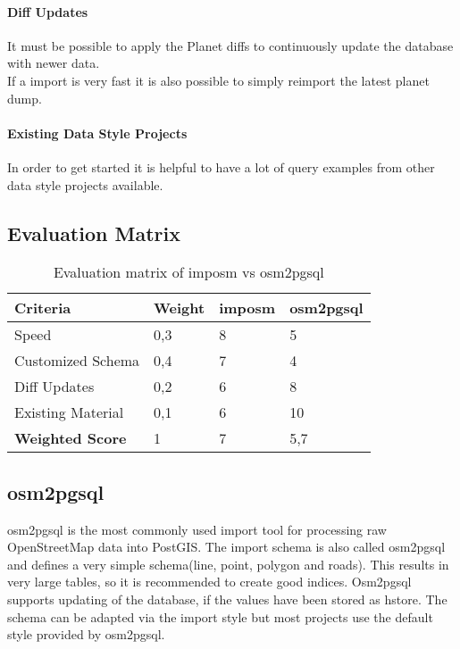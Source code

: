 \paragraph{Diff Updates}
It must be possible to apply the Planet diffs \cite{5_wiki.openstreetmap.org_2015}
to continuously update the database with newer data.
\\
If a import is very fast it is also possible to simply reimport the latest
planet dump.

\paragraph{Existing Data Style Projects}
In order to get started it is helpful to have a lot of query examples
from other data style projects available.

\subsection{Evaluation Matrix}\label{evaluation_matrix}

\begin{table}[H]
\centering
    \begin{tabular}{llll}
    \hline
    Criteria         & Weight & imposm & osm2pgsql \\
    \hline
    Speed             & 0,3    & 8      & 5         \\
    Customized Schema & 0,4    & 7      & 4         \\
    Diff Updates      & 0,2    & 6      & 8         \\
    Existing Material & 0,1    & 6      & 10        \\
    \hline
    \textbf{Weighted Score} & 1      & 7      & 5,7       \\
    \end{tabular}
    \caption{Evaluation matrix of imposm vs osm2pgsql}
\end{table}


\subsection{osm2pgsql}\label{osm2pgsql_importer}

osm2pgsql\cite{4_wiki.openstreetmap.org_2015} is the
most commonly used import tool for processing raw OpenStreetMap data into PostGIS.
The import schema is also called osm2pgsql and defines a very
simple schema(line, point, polygon and
roads)\cite{6_wiki.openstreetmap.org_2015}.
This results in very large tables, so it is recommended to create good
indices. Osm2pgsql supports updating of the database, if the values have
been stored as hstore. The schema can be adapted via the import style \cite{7_wiki.openstreetmap.org_2015}
but most projects use the default style\cite{8_github_2015} provided by osm2pgsql.

